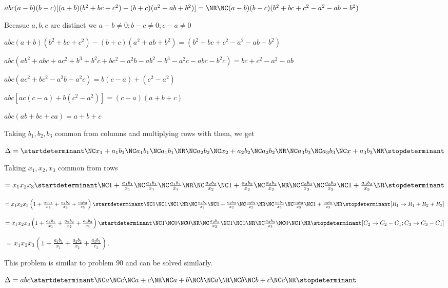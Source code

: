   $abc(a - b)(b - c)[(a + b)(b^2 + bc + c^2) - (b + c)(a^2 + ab + b^2)] =\NR\NC
  (a - b)(b - c)(b^2 + bc + c^2 - a^2 - ab - b^2)$

  Becasue $a, b, c$ are distinct we $a - b \neq 0; b - c \neq 0;
  c - a\neq 0$

  $abc(a + b)(b^2 + bc + c^2) - (b + c)(a^2 + ab + b^2) = (b^2 + bc +
  c^2 - a^2 - ab - b^2)$

  $abc(ab^2 + abc + ac^2 + b^3 + b^2c + bc^2 - a^2b - ab^2 - b^3 -
  a^2c - abc - b^2c) = bc + c^2 - a^2 -ab$

  $abc(ac^2 + bc^2 - a^2b - a^2c) = b(c - a) + (c^2 - a^2)$

  $abc[ac(c - a) + b(c^2 - a^2)] = (c - a)(a + b + c)$

  $abc(ab + bc + ca) = a + b + c$
\item Taking $b_1, b_2, b_3$ common from columns and multiplying rows with
  them, we get

  $\Delta = \startdeterminant\NC x_1 + a_1b_1 \NC a_1b_1 \NC a_1b_1 \NR\NC a_2b_2 \NC
  x_2 + a_2b_2 \NC a_2b_2 \NR\NC a_3b_3 \NC a_3b_3 \NC x + a_3b_3\NR\stopdeterminant$

  Taking $x_1,x_2,x_3$ common from rows

  $= x_1x_2x_3\startdeterminant\NC1 + \frac{a_1b_1}{x_1} \NC \frac{a_1b_1}{x_1} \NC
  \frac{a_1b_1}{x_1} \NR\NC \frac{a_2b_2}{x_2} \NC 1 + \frac{a_2b_2}{x_2} \NC
  \frac{a_2b_2}{x_2} \NR\NC \frac{a_3b_3}{x_3} \NC \frac{a_3b_3}{x_3} \NC 1 +
  \frac{a_3b_3}{x_3}\NR\stopdeterminant$

  $= x_1x_2x_3\left(1 + \frac{a_1b_1}{x_1} + \frac{a_2b_2}{x_2} +
  \frac{a_3b_3}{c_3}\right) \startdeterminant\NC1 \NC 1 \NC 1 \NR\NC \frac{a_2b_2}{x_2} \NC
  1 + \frac{a_2b_2}{x_2} \NC \frac{a_2b_2}{x_2} \NR\NC \frac{a_3b_3}{x_3} \NC
  \frac{a_3b_3}{x_3} \NC 1 + \frac{a_3b_3}{x_3}\NR\stopdeterminant[R_1 \rightarrow
    R_1 + R_2 + R_3]$

  $= x_1x_2x_3\left(1 + \frac{a_1b_1}{x_1} + \frac{a_2b_2}{x_2} +
  \frac{a_3b_3}{c_3}\right)\startdeterminant\NC1 \NC 0 \NC 0 \NR\NC \frac{a_2b_2}{x_2} \NC
  1 \NC 0 \NR\NC \frac{a_3b_3}{x_3} \NC 0 \NC 1\NR\stopdeterminant[C_2\rightarrow C_2 - C_1;
    C_3 \rightarrow C_3 - C_1]$

  $= x_1x_2x_3\left(1 + \frac{a_1b_1}{x_1} + \frac{a_2b_2}{x_2} +
  \frac{a_3b_3}{c_3}\right)$.
\item This problem is similar to problem $90$ and can be solved similarly.
\item $\Delta = abc\startdeterminant\NC a \NC c \NC a + c \NR\NC a + b \NC b \NC a \NR\NC b \NC
  b + c \NC c\NR\stopdeterminant$

